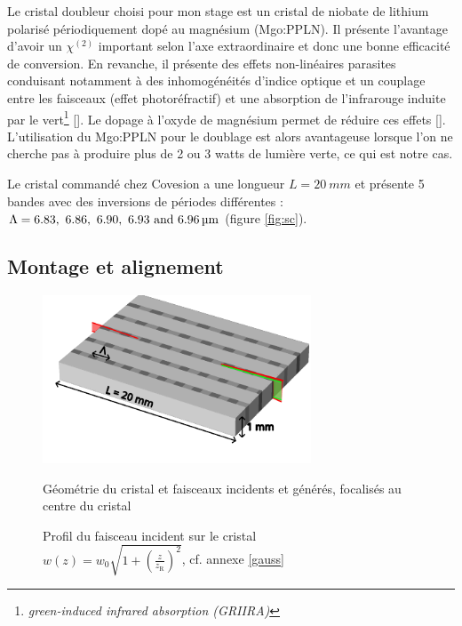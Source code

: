 \documentclass[11pt,a4paper]{article}
\newcommand{\ncite}[1]{[\citenum{#1}]}
\edef\hc{\string:}\newcommand{\dv}[2]{\frac{\mathrm d #1}{\mathrm d #2}}
\newcommand{\zr}{z_\mathsc{R}}
\newcommand{\mathsc}[1]{\mathrm{\scriptscriptstyle {#1}}}
\begin{document}
Le cristal doubleur choisi pour mon stage est un cristal de niobate de lithium polarisé périodiquement dopé au magnésium (Mgo\hc PPLN). Il présente l'avantage d'avoir un $\chi^{(2)}$ important selon l'axe extraordinaire et donc une bonne efficacité de conversion. En revanche, il présente des effets non-linéaires parasites conduisant notamment à des inhomogénéités d'indice optique et un couplage entre les faisceaux (effet photoréfractif) et une absorption de l'infrarouge induite par le vert\footnote{\textit{green-induced infrared absorption (GRIIRA)}} \ncite{batchko}. Le dopage à l'oxyde de magnésium permet de réduire ces effets \ncite{furukawa}. L'utilisation du Mgo\hc PPLN pour le doublage est alors avantageuse lorsque l'on ne cherche pas à produire plus de 2 ou 3 watts de lumière verte, ce qui est notre cas. %

Le cristal commandé chez Covesion a une longueur $L=\SI{20}{mm}$ et présente 5 bandes avec des inversions de périodes différentes : $\Lambda = \qtylist[list-units = single]{6.83; 6.86 ; 6.90 ; 6.93 ; 6,96}{\micro\meter}$ (figure \ref{fig:sc}).

\subsection{Montage et alignement}  



\begin{figure}[htpb]
\centering
\hspace*{-0.8cm}
\begin{minipage}[b]{0.48\textwidth}
	\centering
	\vspace{0.5cm}
	\includegraphics[height=5cm]{./img/cristal2.pdf}
	\vspace{1cm}
	\caption{Géométrie du cristal et faisceaux incidents et générés, focalisés au centre du cristal}
	\label{fig:sc}
\end{minipage}
\centering
\hspace*{0.4cm}
\begin{minipage}[b]{0.48\textwidth}
    
	\vspace{-1cm}
    \caption[Profil du faisceau incident sur le cristal]{Profil du faisceau incident sur le cristal \\ \small $w(z) = w_0 \sqrt{1+\left(\frac{z}{\zr}\right)^2}$, cf. annexe \ref{gauss}}
    \label{fig:wincident}
\end{minipage}
\end{figure}
\end{document}
